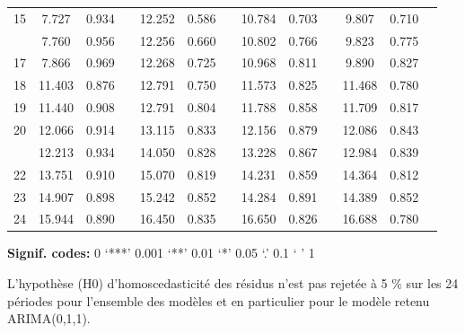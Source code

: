 \documentclass[,french]{article}
\begin{document}
\begin{table}[!h]
{\begin{threeparttable}
\begin{tabular}[t]{ccccccccccccc}
15 & 7.727 & 0.934 &  & 12.252 & 0.586 &  & 10.784 & 0.703 &  & 9.807 & 0.710 & \\
\addlinespace
16 & 7.760 & 0.956 &  & 12.256 & 0.660 &  & 10.802 & 0.766 &  & 9.823 & 0.775 & \\
17 & 7.866 & 0.969 &  & 12.268 & 0.725 &  & 10.968 & 0.811 &  & 9.890 & 0.827 & \\
18 & 11.403 & 0.876 &  & 12.791 & 0.750 &  & 11.573 & 0.825 &  & 11.468 & 0.780 & \\
19 & 11.440 & 0.908 &  & 12.791 & 0.804 &  & 11.788 & 0.858 &  & 11.709 & 0.817 & \\
20 & 12.066 & 0.914 &  & 13.115 & 0.833 &  & 12.156 & 0.879 &  & 12.086 & 0.843 & \\
\addlinespace
21 & 12.213 & 0.934 &  & 14.050 & 0.828 &  & 13.228 & 0.867 &  & 12.984 & 0.839 & \\
22 & 13.751 & 0.910 &  & 15.070 & 0.819 &  & 14.231 & 0.859 &  & 14.364 & 0.812 & \\
23 & 14.907 & 0.898 &  & 15.242 & 0.852 &  & 14.284 & 0.891 &  & 14.389 & 0.852 & \\
24 & 15.944 & 0.890 &  & 16.450 & 0.835 &  & 16.650 & 0.826 &  & 16.688 & 0.780 & \\
\bottomrule
\end{tabular}
\begin{tablenotes}
\item \hspace{-0.4cm}\textbf{Signif. codes: }0 `***' 0.001 `**' 0.01 `*' 0.05 `.' 0.1 ` ' 1
\item L’hypothèse (H0) d’homoscedasticité des résidus n’est pas rejetée à 5 \% sur les 24 périodes pour l’ensemble des modèles et en particulier pour le modèle retenu ARIMA(0,1,1).
\end{tablenotes}
\end{threeparttable}}
\end{table}
\end{document}
